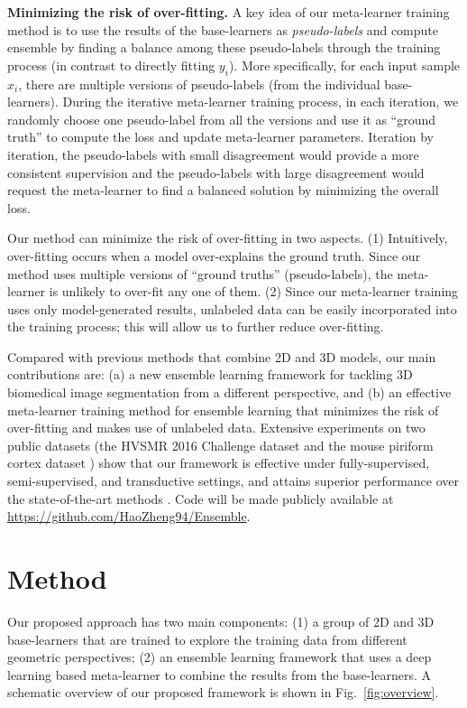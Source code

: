 \documentclass[letterpaper]{article}
\begin{document}
\textbf{Minimizing the risk of over-fitting.}
A key idea of our meta-learner training method is to use the results of the base-learners as {\it pseudo-labels} \cite{lee2013pseudo} and compute ensemble by finding a balance among these pseudo-labels through the training process (in contrast to directly fitting $y_i$). More specifically, for each input sample $x_i$, there are multiple versions of pseudo-labels (from the individual base-learners). During the iterative meta-learner training process, in each iteration, we randomly choose one pseudo-label from all the versions and use it as ``ground truth'' to compute the loss and update meta-learner parameters.
Iteration by iteration, the pseudo-labels with small disagreement would provide a more consistent supervision and the pseudo-labels with large disagreement would request the meta-learner to find a balanced solution by minimizing the overall loss.

Our method can minimize the risk of over-fitting in two aspects. (1) Intuitively, over-fitting occurs when a model over-explains the ground truth. Since our method uses multiple versions of ``ground truths'' (pseudo-labels), the meta-learner is unlikely to over-fit any one of them. (2) Since our meta-learner training uses only model-generated results, unlabeled data can be easily incorporated into the training process; this will allow us to further reduce over-fitting.




Compared with previous methods that combine 2D and 3D models, our main contributions are:
(a) a new ensemble learning framework for tackling 3D biomedical image segmentation from a different perspective, and
(b) an effective meta-learner training method for ensemble learning that minimizes the risk of over-fitting and makes use of unlabeled data.
Extensive experiments on two public datasets (the HVSMR 2016 Challenge dataset \cite{pace2015interactive} and the mouse piriform cortex dataset \cite{lee2015recursive}) show that our framework is effective under fully-supervised, semi-supervised, and transductive settings, and attains superior performance over the state-of-the-art methods \cite{yu2017automatic,neuron2,chen2017voxresnet}.
Code will be made publicly available at
\mbox{\url{https://github.com/HaoZheng94/Ensemble}}.


\section{Method}\label{Sec-Method}
Our proposed approach has two main components:
(1) a group of 2D and 3D base-learners that are trained to explore the training data from different geometric perspectives;
(2) an ensemble learning framework that uses a deep learning based meta-learner to combine the results from the base-learners. A schematic overview of our proposed framework is shown in Fig.~\ref{fig:overview}.
\end{document}
